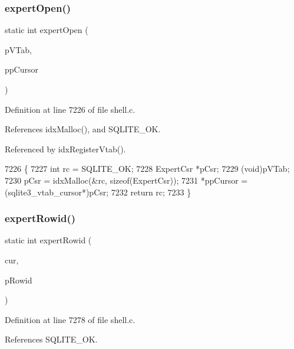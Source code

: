 \subsubsection{expert\+Open()}
{\footnotesize\ttfamily static int expert\+Open (\begin{DoxyParamCaption}\item[{\textbf{ sqlite3\+\_\+vtab} $\ast$}]{p\+V\+Tab,  }\item[{\textbf{ sqlite3\+\_\+vtab\+\_\+cursor} $\ast$$\ast$}]{pp\+Cursor }\end{DoxyParamCaption})\hspace{0.3cm}{\ttfamily [static]}}



Definition at line 7226 of file shell.\+c.



References idx\+Malloc(), and S\+Q\+L\+I\+T\+E\+\_\+\+OK.



Referenced by idx\+Register\+Vtab().


\begin{DoxyCode}
7226                                                                           \{
7227   \textcolor{keywordtype}{int} rc = SQLITE_OK;
7228   ExpertCsr *pCsr;
7229   (void)pVTab;
7230   pCsr = idxMalloc(&rc, \textcolor{keyword}{sizeof}(ExpertCsr));
7231   *ppCursor = (sqlite3_vtab_cursor*)pCsr;
7232   \textcolor{keywordflow}{return} rc;
7233 \}
\end{DoxyCode}
\mbox{\label{shell_8c_ae0f9f25fbbdbf7a84f832a117aec2fe3}} 
\subsubsection{expert\+Rowid()}
{\footnotesize\ttfamily static int expert\+Rowid (\begin{DoxyParamCaption}\item[{\textbf{ sqlite3\+\_\+vtab\+\_\+cursor} $\ast$}]{cur,  }\item[{\textbf{ sqlite\+\_\+int64} $\ast$}]{p\+Rowid }\end{DoxyParamCaption})\hspace{0.3cm}{\ttfamily [static]}}



Definition at line 7278 of file shell.\+c.



References S\+Q\+L\+I\+T\+E\+\_\+\+OK.



